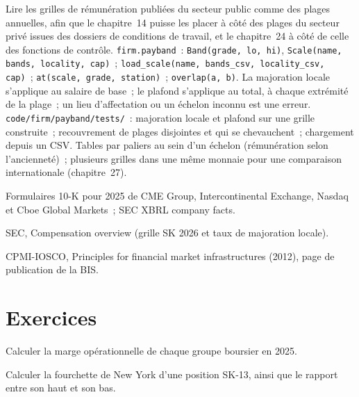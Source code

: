 \begin{build}
 Lire les grilles de rémunération publiées du secteur public comme des plages annuelles, afin que le chapitre~14 puisse les placer à côté des
plages du secteur privé issues des dossiers de conditions de travail, et le chapitre~24 à côté de celle des fonctions de contrôle.
 \texttt{firm.payband}~: \texttt{Band(grade, lo, hi)}, \texttt{Scale(name, bands, locality, cap)}~;
\texttt{load\_scale(name, bands\_csv, locality\_csv, cap)}~; \texttt{at(scale, grade, station)}~; \texttt{overlap(a, b)}.
 La majoration locale s'applique au salaire de base~; le plafond s'applique au total, à chaque extrémité de la plage~; un lieu
d'affectation ou un échelon inconnu est une erreur.
 \texttt{code/firm/payband/tests/}~: majoration locale et plafond sur une grille construite~; recouvrement de
plages disjointes et qui se chevauchent~; chargement depuis un CSV.
 Tables par paliers au sein d'un échelon (rémunération selon l'ancienneté)~; plusieurs grilles dans une même monnaie pour une comparaison
internationale (chapitre~27).
\end{build}

\begin{omsources}
\item Formulaires 10-K pour 2025 de CME Group, Intercontinental Exchange, Nasdaq et Cboe Global Markets~; SEC XBRL company facts.
\item SEC, Compensation overview (grille SK 2026 et taux de majoration locale).
\item CPMI-IOSCO, Principles for financial market infrastructures (2012), page de publication de la BIS.
\end{omsources}

\section{Exercices}

\begin{exercise}[$\star$]\label{exo:in:exchanges-brokers-vendors-and-regulators-as-employers:1}
Calculer la marge opérationnelle de chaque groupe boursier en 2025.
\end{exercise}

\begin{exercise}[$\star$]\label{exo:in:exchanges-brokers-vendors-and-regulators-as-employers:2}
Calculer la fourchette de New York d'une position SK-13, ainsi que le rapport entre son haut et son bas.
\end{exercise}

